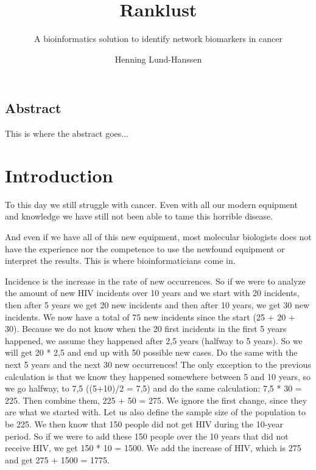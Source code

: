 \documentclass[UKenglish]{ifimaster}
\title{Ranklust}
\subtitle{A bioinformatics solution to identify network biomarkers in cancer}
\author{Henning Lund-Hanssen}
\begin{document}
\ififorside{}
\frontmatter{}
\maketitle{}

\chapter*{Abstract}
This is where the abstract goes...

\tableofcontents{}
\listoffigures{}
\listoftables{}

\mainmatter{}

\part{Introduction}
To this day we still struggle with cancer. Even with all our modern equipment and knowledge we have still not been able
to tame this horrible disease. 

And even if we have all of this new equipment, most molecular biologists does not have the experience nor the competence
to use the newfound equipment or interpret the results. This is where bioinformaticians come in. 

Incidence is the increase in the rate of new occurrences. So if we were to analyze the amount of new HIV incidents over
10 years and we start with 20 incidents, then after 5 years we get 20 new incidents and then after 10 years, we get 30
new incidents. We now have a total of 75 new incidents since the start (25 + 20 + 30).  Because we do not know when the
20 first incidents in the first 5 years happened, we assume they happened after 2,5 years (halfway to 5 years). So we
will get 20 * 2,5 and end up with 50 possible new cases. Do the same with the next 5 years and the next 30 new
occurrences! The only exception to the previous calculation is that we know they happened somewhere between 5 and 10
years, so we go halfway, to 7,5 ((5+10)/2 = 7,5) and do the same calculation: 7,5 * 30 = 225. Then combine them, 225 +
50 = 275. We ignore the first change, since they are what we started with. Let us also define the sample size of the
population to be 225. We then know that 150 people did not get HIV during the 10-year period. So if we were to add these
150 people over the 10 years that did not receive HIV, we get 150 * 10 = 1500. We add the increase of HIV, which is 275
and get 275 + 1500 = 1775. 
\end{document}
